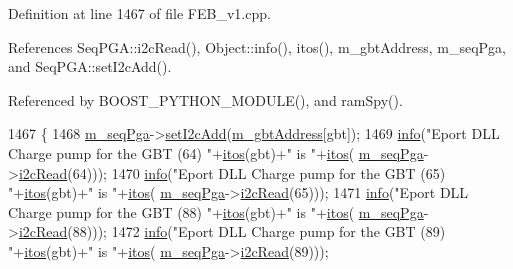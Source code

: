 Definition at line 1467 of file F\+E\+B\+\_\+v1.\+cpp.



References Seq\+P\+G\+A\+::i2c\+Read(), Object\+::info(), itos(), m\+\_\+gbt\+Address, m\+\_\+seq\+Pga, and Seq\+P\+G\+A\+::set\+I2c\+Add().



Referenced by B\+O\+O\+S\+T\+\_\+\+P\+Y\+T\+H\+O\+N\+\_\+\+M\+O\+D\+U\+L\+E(), and ram\+Spy().


\begin{DoxyCode}
1467                                  \{
1468   \hyperlink{classFEB__v1_a6c7804ac86796f233a8393043adf2e77}{m\_seqPga}->\hyperlink{classSeqPGA_a4ef334e4d2cb417b49033dce951728cd}{setI2cAdd}(\hyperlink{classFEB__v1_ac625855df976f16694178f1a4c0eef1e}{m\_gbtAddress}[gbt]);
1469   \hyperlink{classObject_a644fd329ea4cb85f54fa6846484b84a8}{info}(\textcolor{stringliteral}{"Eport DLL Charge pump for the GBT (64)  "}+\hyperlink{Tools_8h_af330027dbdafb9a30768b3613c553e60}{itos}(gbt)+\textcolor{stringliteral}{" is "}+\hyperlink{Tools_8h_af330027dbdafb9a30768b3613c553e60}{itos}(
      \hyperlink{classFEB__v1_a6c7804ac86796f233a8393043adf2e77}{m\_seqPga}->\hyperlink{classSeqPGA_a7cd344df2be99f3a02b487f80e87b27e}{i2cRead}(64)));
1470   \hyperlink{classObject_a644fd329ea4cb85f54fa6846484b84a8}{info}(\textcolor{stringliteral}{"Eport DLL Charge pump for the GBT (65)  "}+\hyperlink{Tools_8h_af330027dbdafb9a30768b3613c553e60}{itos}(gbt)+\textcolor{stringliteral}{" is "}+\hyperlink{Tools_8h_af330027dbdafb9a30768b3613c553e60}{itos}(
      \hyperlink{classFEB__v1_a6c7804ac86796f233a8393043adf2e77}{m\_seqPga}->\hyperlink{classSeqPGA_a7cd344df2be99f3a02b487f80e87b27e}{i2cRead}(65)));
1471   \hyperlink{classObject_a644fd329ea4cb85f54fa6846484b84a8}{info}(\textcolor{stringliteral}{"Eport DLL Charge pump for the GBT (88)  "}+\hyperlink{Tools_8h_af330027dbdafb9a30768b3613c553e60}{itos}(gbt)+\textcolor{stringliteral}{" is "}+\hyperlink{Tools_8h_af330027dbdafb9a30768b3613c553e60}{itos}(
      \hyperlink{classFEB__v1_a6c7804ac86796f233a8393043adf2e77}{m\_seqPga}->\hyperlink{classSeqPGA_a7cd344df2be99f3a02b487f80e87b27e}{i2cRead}(88)));
1472   \hyperlink{classObject_a644fd329ea4cb85f54fa6846484b84a8}{info}(\textcolor{stringliteral}{"Eport DLL Charge pump for the GBT (89)  "}+\hyperlink{Tools_8h_af330027dbdafb9a30768b3613c553e60}{itos}(gbt)+\textcolor{stringliteral}{" is "}+\hyperlink{Tools_8h_af330027dbdafb9a30768b3613c553e60}{itos}(
      \hyperlink{classFEB__v1_a6c7804ac86796f233a8393043adf2e77}{m\_seqPga}->\hyperlink{classSeqPGA_a7cd344df2be99f3a02b487f80e87b27e}{i2cRead}(89)));

\end{DoxyCode}
